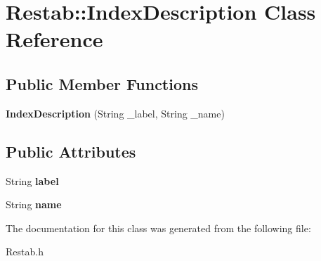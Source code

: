 \hypertarget{classRestab_1_1IndexDescription}{
\section{Restab::IndexDescription Class Reference}
\label{classRestab_1_1IndexDescription}
}
\subsection*{Public Member Functions}
\begin{DoxyCompactItemize}
\item 
\hypertarget{classRestab_1_1IndexDescription_a32286b1e431f828502998eb7f7e5c718}{
{\bfseries IndexDescription} (String \_\-label, String \_\-name)}
\label{classRestab_1_1IndexDescription_a32286b1e431f828502998eb7f7e5c718}

\end{DoxyCompactItemize}
\subsection*{Public Attributes}
\begin{DoxyCompactItemize}
\item 
\hypertarget{classRestab_1_1IndexDescription_a60b99f5b5a2549229060ded6574891c0}{
String {\bfseries label}}
\label{classRestab_1_1IndexDescription_a60b99f5b5a2549229060ded6574891c0}

\item 
\hypertarget{classRestab_1_1IndexDescription_a29135a01a17adeb1a09b07a613ed9507}{
String {\bfseries name}}
\label{classRestab_1_1IndexDescription_a29135a01a17adeb1a09b07a613ed9507}

\end{DoxyCompactItemize}


The documentation for this class was generated from the following file:\begin{DoxyCompactItemize}
\item 
Restab.h\end{DoxyCompactItemize}

